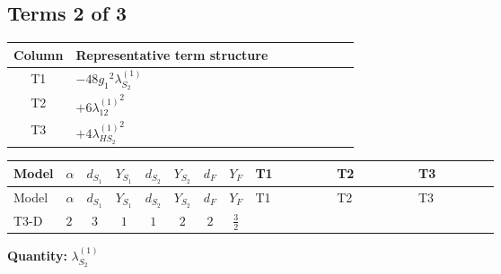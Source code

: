 \documentclass[8pt]{article}
\begin{document}
\begin{landscape}
\subsection*{Terms 2 of 3}
\begin{center}
\begin{tabular}{@{}c >{\raggedright\arraybackslash}p{0.82\linewidth}@{}}
\toprule
Column & Representative term structure \\
\midrule
T1 & \(\displaystyle -48 {g_1}^2 {\lambda_{S_2}^{(1)}}\) \\
\midrule
T2 & \(\displaystyle +6 {\lambda_{12}^{(1)}}^2\) \\
\midrule
T3 & \(\displaystyle +4 {\lambda_{HS_2}^{(1)}}^2\) \\
\midrule
\bottomrule
\end{tabular}
\end{center}
\smallskip
\tiny
\begin{longtable}{@{}llcccccc >{\raggedright\arraybackslash}p{0.21\linewidth} >{\raggedright\arraybackslash}p{0.21\linewidth} >{\raggedright\arraybackslash}p{0.21\linewidth}@{}}
\toprule
Model & $\alpha$ & $d_{S_1}$ & $Y_{S_1}$ & $d_{S_2}$ & $Y_{S_2}$ & $d_F$ & $Y_F$ & T1 & T2 & T3 \\
\midrule
\endfirsthead
\toprule
Model & $\alpha$ & $d_{S_1}$ & $Y_{S_1}$ & $d_{S_2}$ & $Y_{S_2}$ & $d_F$ & $Y_F$ & T1 & T2 & T3 \\
\midrule
\endhead
T3-D & $2$ & $3$ & $1$ & $1$ & $2$ & $2$ & $\frac{3}{2}$ & \scriptsize\adjustbox{max width=\linewidth}{$\begin{gathered} -48 {g_1}^2 {\lambda_{S_2}^{(1)}}\end{gathered}$} & \scriptsize\adjustbox{max width=\linewidth}{$\begin{gathered} +6 {\lambda_{12}^{(1)}}^2\end{gathered}$} & \scriptsize\adjustbox{max width=\linewidth}{$\begin{gathered} +4 {\lambda_{HS_2}^{(1)}}^2\end{gathered}$} \\
\midrule
\bottomrule
\end{longtable}
\clearpage
\noindent\textbf{Quantity: }$\lambda_{S_2}^{(1)}$\par\smallskip

\end{landscape}
\end{document}
